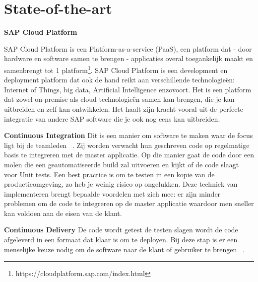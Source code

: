 
\section{State-of-the-art}
\label{sec:state-of-the-art}
\large{\textbf{SAP Cloud Platform}}

SAP Cloud Platform is een Platform-as-a-service (PaaS), een platform dat - door hardware en software samen te brengen - applicaties overal toegankelijk maakt en samenbrengt tot 1 platform\footnote{https://cloudplatform.sap.com/index.html}.
SAP Cloud Platform is een development en deployment platform dat ook de hand reikt aan verschillende technologieën: Internet of Things, big data, Artificial Intelligence enzovoort. Het is een platform dat zowel on-premise als cloud technologieën samen kan brengen, die je kan uitbreiden en zelf kan ontwikkelen. Het haalt zijn kracht vooral uit de perfecte integratie van andere SAP software die je ook nog eens kan uitbreiden. 

\large{\textbf{Continuous Integration}}
Dit is een manier om software te maken waar de focus ligt bij de teamleden ~\autocite{Fowler2006}. Zij worden verwacht hun geschreven code op regelmatige basis te integreren met de master applicatie. Op die manier gaat de code door een molen die een geautomatiseerde build zal uitvoeren en kijkt of de code slaagt voor Unit tests. Een best practice is om te testen in een kopie van de productieomgeving, zo heb je weinig risico op ongelukken.
Deze techniek van implementeren brengt bepaalde voordelen met zich mee: er zijn minder problemen om de code te integreren op de master applicatie waardoor men sneller kan voldoen aan de eisen van de klant.

\large{\textbf{Continuous Delivery}}
De code wordt getest  de testen slagen wordt de code afgeleverd in een formaat dat klaar is om te deployen.
Bij deze stap is er een menselijke keuze nodig om de software naar de klant of gebruiker te brengen ~\autocite{Fowler2013}.


